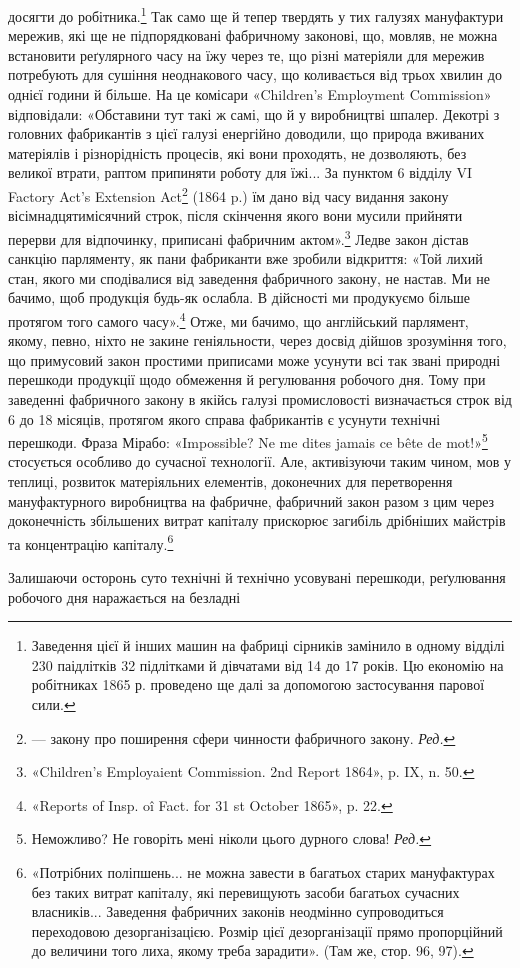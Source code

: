 \parcont{}  %
досягти до робітника.\footnote{
Заведення цієї й інших машин на фабриці сірників замінило в
одному відділі  230 паідлітків 32 підлітками й дівчатами від 14 до 17 років.
Цю економію на робітниках 1865 р. проведено ще далі за допомогою застосування
парової сили.
} Так само ще й тепер твердять у тих
галузях мануфактури мережив, які ще не підпорядковані фабричному
законові, що, мовляв, не можна встановити реґулярного
часу на їжу через те, що різні матеріяли для мережив потребують
для сушіння неоднакового часу, що коливається від трьох хвилин
до однієї години й більше. На це комісари «Children’s Employment
Commission» відповідали: «Обставини тут такі ж самі, що
й у виробництві шпалер. Декотрі з головних фабрикантів з цієї
галузі енергійно доводили, що природа вживаних матеріялів і
різнорідність процесів, які вони проходять, не дозволяють, без великої
втрати, раптом припиняти роботу для їжі... За пунктом 6
відділу VI Factory Act’s Extension Act\footnote*{
— закону про поширення сфери чинности фабричного закону. \emph{Ред.}
} (1864 p.) їм дано від
часу видання закону вісімнадцятимісячний строк, після скінчення
якого вони мусили прийняти перерви для відпочинку,
приписані фабричним актом».\footnote{
«Children’s Employaient Commission. 2nd Report 1864», p. IX,
n. 50.
} Ледве закон дістав санкцію
парляменту, як пани фабриканти вже зробили відкриття: «Той
лихий стан, якого ми сподівалися від заведення фабричного закону,
не настав. Ми не бачимо, щоб продукція будь-як ослабла.
В дійсності ми продукуємо більше протягом того самого часу».\footnote{
«Reports of Insp. oî Fact. for 31 st October 1865», p. 22.
}
Отже, ми бачимо, що англійський парлямент, якому, певно,
ніхто не закине геніяльности, через досвід дійшов зрозуміння
того, що примусовий закон простими приписами може усунути
всі так звані природні перешкоди продукції щодо обмеження
й регулювання робочого дня. Тому при заведенні фабричного
закону в якійсь галузі промисловості визначається строк від 6
до 18 місяців, протягом якого справа фабрикантів є усунути
технічні перешкоди. Фраза Мірабо: «Impossible? Ne me dites
jamais ce bête de mot!»\footnote*{
Неможливо? Не говоріть мені ніколи цього дурного слова! \emph{Ред.}
} стосується особливо до сучасної технології.
Але, активізуючи таким чином, мов у теплиці, розвиток
матеріяльних елементів, доконечних для перетворення мануфактурного
виробництва на фабричне, фабричний закон разом з
цим через доконечність збільшених витрат капіталу прискорює
загибіль дрібніших майстрів та концентрацію капіталу.\footnote{
«Потрібних поліпшень... не можна завести в багатьох старих
мануфактурах без таких витрат капіталу, які перевищують засоби багатьох
сучасних власників... Заведення фабричних законів неодмінно
супроводиться переходовою дезорганізацією. Розмір цієї дезорганізації
прямо пропорційний до величини того лиха, якому треба зарадити».
(Там же, стор. 96, 97).
}

Залишаючи осторонь суто технічні й технічно усовувані
перешкоди, реґулювання робочого дня наражається на безладні
\parbreak{}  %
